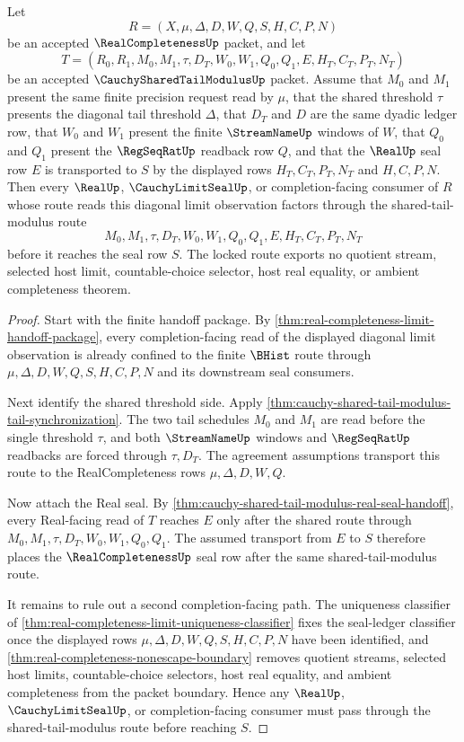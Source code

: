 \begin{theorem}
\label{thm:real-completeness-shared-tail-modulus-limit-lock}
Let
$$
R=(X,\mu,\Delta,D,W,Q,S,H,C,P,N)
$$
be an accepted $\RealCompletenessUp$ packet, and let
$$
T=(R_0,R_1,M_0,M_1,\tau,D_T,W_0,W_1,Q_0,Q_1,E,H_T,C_T,P_T,N_T)
$$
be an accepted $\CauchySharedTailModulusUp$ packet. Assume that $M_0$ and $M_1$ present the same finite precision request read by $\mu$, that the shared threshold $\tau$ presents the diagonal tail threshold $\Delta$, that $D_T$ and $D$ are the same dyadic ledger row, that $W_0$ and $W_1$ present the finite $\StreamNameUp$ windows of $W$, that $Q_0$ and $Q_1$ present the $\RegSeqRatUp$ readback row $Q$, and that the $\RealUp$ seal row $E$ is transported to $S$ by the displayed rows $H_T,C_T,P_T,N_T$ and $H,C,P,N$. Then every $\RealUp$, $\CauchyLimitSealUp$, or completion-facing consumer of $R$ whose route reads this diagonal limit observation factors through the shared-tail-modulus route
$$
M_0,M_1,\tau,D_T,W_0,W_1,Q_0,Q_1,E,H_T,C_T,P_T,N_T
$$
before it reaches the seal row $S$. The locked route exports no quotient stream, selected host limit, countable-choice selector, host real equality, or ambient completeness theorem.
\end{theorem}
\begin{proof}
Start with the finite handoff package. By \autoref{thm:real-completeness-limit-handoff-package}, every completion-facing read of the displayed diagonal limit observation is already confined to the finite $\BHist$ route through $\mu,\Delta,D,W,Q,S,H,C,P,N$ and its downstream seal consumers.

Next identify the shared threshold side. Apply \autoref{thm:cauchy-shared-tail-modulus-tail-synchronization}. The two tail schedules $M_0$ and $M_1$ are read before the single threshold $\tau$, and both $\StreamNameUp$ windows and $\RegSeqRatUp$ readbacks are forced through $\tau,D_T$. The agreement assumptions transport this route to the RealCompleteness rows $\mu,\Delta,D,W,Q$.

Now attach the Real seal. By \autoref{thm:cauchy-shared-tail-modulus-real-seal-handoff}, every Real-facing read of $T$ reaches $E$ only after the shared route through $M_0,M_1,\tau,D_T,W_0,W_1,Q_0,Q_1$. The assumed transport from $E$ to $S$ therefore places the $\RealCompletenessUp$ seal row after the same shared-tail-modulus route.

It remains to rule out a second completion-facing path. The uniqueness classifier of \autoref{thm:real-completeness-limit-uniqueness-classifier} fixes the seal-ledger classifier once the displayed rows $\mu,\Delta,D,W,Q,S,H,C,P,N$ have been identified, and \autoref{thm:real-completeness-nonescape-boundary} removes quotient streams, selected host limits, countable-choice selectors, host real equality, and ambient completeness from the packet boundary. Hence any $\RealUp$, $\CauchyLimitSealUp$, or completion-facing consumer must pass through the shared-tail-modulus route before reaching $S$.
\end{proof}

